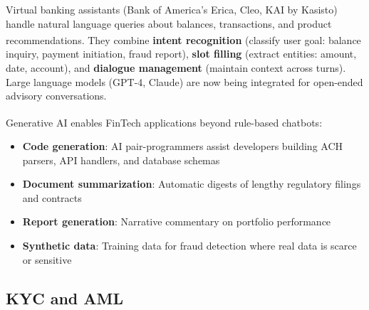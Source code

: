\begin{tcbitemize}[ skin=sectionraster ]

    \tcbitem[title=NLP-Powered Banking Assistants, raster multicolumn=3]
    Virtual banking assistants (Bank of America's Erica, Cleo, KAI by Kasisto) handle natural language queries about balances, transactions, and product recommendations\textsuperscript{\cite[][p.~14]{kardellBuildFinancialSoftware2025}}.
    They combine \textbf{intent recognition} (classify user goal: balance inquiry, payment initiation, fraud report), \textbf{slot filling} (extract entities: amount, date, account), and \textbf{dialogue management} (maintain context across turns).
    Large language models (GPT-4, Claude) are now being integrated for open-ended advisory conversations.

    \tcbitem[title={Generative AI in Finance}, raster multicolumn=3]
    Generative AI enables FinTech applications beyond rule-based chatbots\textsuperscript{\cite[][pp.~13--15]{kardellBuildFinancialSoftware2025}}:
    \tcblower
    \begin{itemize}
        \item \textbf{Code generation}: AI pair-programmers assist developers building ACH parsers, API handlers, and database schemas
        \item \textbf{Document summarization}: Automatic digests of lengthy regulatory filings and contracts
        \item \textbf{Report generation}: Narrative commentary on portfolio performance
        \item \textbf{Synthetic data}: Training data for fraud detection where real data is scarce or sensitive
    \end{itemize}

\end{tcbitemize}

\subsection{KYC and AML}

